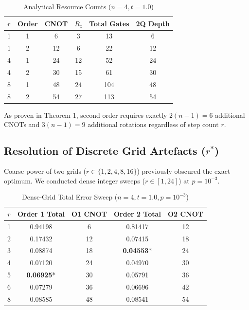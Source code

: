\documentclass[conference]{IEEEtran}
\begin{document}
\begin{table}[htbp]
\caption{Analytical Resource Counts ($n = 4, t = 1.0$)}
\begin{center}
\begin{tabular}{cccccc}
\toprule
$r$ & Order & CNOT & $R_z$ & Total Gates & 2Q Depth \\
\midrule
1 & 1 & 6  & 3  & 13  & 6  \\
1 & 2 & 12 & 6  & 22  & 12 \\
4 & 1 & 24 & 12 & 52  & 24 \\
4 & 2 & 30 & 15 & 61  & 30 \\
8 & 1 & 48 & 24 & 104 & 48 \\
8 & 2 & 54 & 27 & 113 & 54 \\
\bottomrule
\end{tabular}
\end{center}
\label{tab:resources}
\end{table}

As proven in Theorem 1, second order requires exactly $2(n-1) = 6$ additional CNOTs and $3(n-1) = 9$ additional rotations regardless of step count $r$.

\subsection{Resolution of Discrete Grid Artefacts ($r^*$)}
Coarse power-of-two grids ($r \in \{1, 2, 4, 8, 16\}$) previously obscured the exact optimum. We conducted dense integer sweeps ($r \in [1, 24]$) at $p = 10^{-3}$.

\begin{table}[htbp]
\caption{Dense-Grid Total Error Sweep ($n = 4, t = 1.0, p = 10^{-3}$)}
\begin{center}
\begin{tabular}{ccccc}
\toprule
$r$ & Order 1 Total & O1 CNOT & Order 2 Total & O2 CNOT \\
\midrule
1 & 0.94198 & 6  & 0.81417 & 12 \\
2 & 0.17432 & 12 & 0.07415 & 18 \\
3 & 0.08874 & 18 & \textbf{0.04553}* & 24 \\
4 & 0.07120 & 24 & 0.04970 & 30 \\
5 & \textbf{0.06925}* & 30 & 0.05791 & 36 \\
6 & 0.07279 & 36 & 0.06696 & 42 \\
8 & 0.08585 & 48 & 0.08541 & 54 \\
\bottomrule
\end{tabular}
\end{center}
\label{tab:dense_grid}
\end{table}
\end{document}
